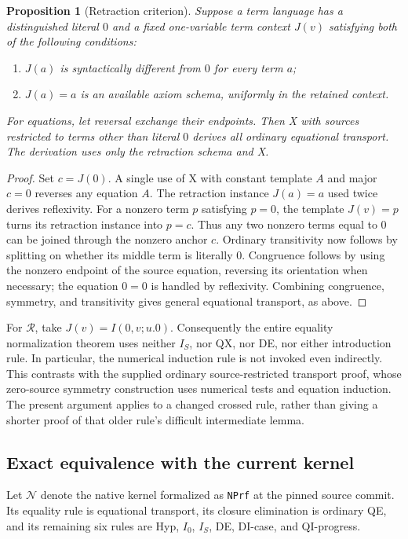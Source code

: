 \documentclass[11pt,letterpaper]{article}
\newtheorem{proposition}[theorem]{Proposition}
\theoremstyle{definition}\newtheorem{definition}[theorem]{Definition}
\theoremstyle{remark}\newtheorem{remark}[theorem]{Remark}
\begin{document}
\begin{proposition}[Retraction criterion]\label{rev:abstract}
Suppose a term language has a distinguished literal $0$ and a fixed
one-variable term context $J(v)$ satisfying both of the following
conditions:
\begin{enumerate}
\item $J(a)$ is syntactically different from $0$ for every term $a$;
\item $J(a)=a$ is an available axiom schema, uniformly in the retained
context.
\end{enumerate}
For equations, let reversal exchange their endpoints. Then X with
sources restricted to terms other than literal $0$ derives all ordinary
equational transport. The derivation uses only the retraction schema
and X.
\end{proposition}
\begin{proof}
Set $c=J(0)$. A single use of X with constant template $A$ and major
$c=0$ reverses any equation $A$. The retraction instance $J(a)=a$ used
twice derives reflexivity. For a nonzero term $p$ satisfying $p=0$,
the template $J(v)=p$ turns its retraction instance into $p=c$.
Thus any two nonzero terms equal to $0$ can be joined through the
nonzero anchor $c$. Ordinary transitivity now follows by splitting on
whether its middle term is literally $0$. Congruence follows by using
the nonzero endpoint of the source equation, reversing its orientation
when necessary; the equation $0=0$ is handled by reflexivity. Combining
congruence, symmetry, and transitivity gives general equational
transport, as above.
\end{proof}

For $\mathcal R$, take $J(v)=I(0,v;u.0)$. Consequently the entire
equality normalization theorem uses neither $I_S$, nor QX, nor DE,
nor either introduction rule. In particular, the numerical induction
rule is not invoked even indirectly. This contrasts with the supplied
ordinary source-restricted transport proof, whose zero-source symmetry
construction uses numerical tests and equation induction. The present
argument applies to a changed crossed rule, rather than giving a
shorter proof of that older rule's difficult intermediate lemma.

\subsection{Exact equivalence with the current kernel}

Let $\mathcal N$ denote the native kernel formalized as
\texttt{NPrf} at the pinned source commit. Its equality rule is
equational transport, its closure elimination is ordinary QE, and its
remaining six rules are Hyp, $I_0$, $I_S$, DE, DI-case, and QI-progress.
\end{document}
